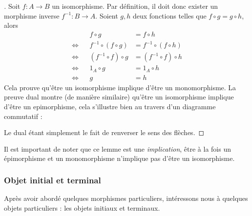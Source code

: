 \documentclass{article}
\begin{document}
\begin{proof}[]{}
    Soit $f:A\to B$ un isomorphisme. Par définition, il doit donc exister un morphisme inverse $f^{-1}:B\to A$. Soient $g, h$ deux fonctions telles que $f\circ g=g\circ h$, alors
    \begin{equation*}
    \begin{aligned}
                        && f\circ g&=f\circ h\\
        \Leftrightarrow && f^{-1}\circ(f\circ g)&=f^{-1}\circ(f\circ h)\\
        \Leftrightarrow && (f^{-1}\circ f)\circ g&=(f^{-1}\circ f)\circ h\\
        \Leftrightarrow && 1_A\circ g&=1_A\circ h\\
        \Leftrightarrow && g&=h
    \end{aligned}
    \end{equation*}
    Cela prouve qu'être un isomorphisme implique d'être un monomorphisme. La preuve dual montre (de manière similaire) qu'être un isomorphisme implique d'être un epimorphisme, cela s'illustre bien au travers d'un diagramme commutatif :

    \begin{center}
    \end{center}
    Le dual étant simplement le fait de renverser le sens des flèches.
\end{proof}

\noindent
Il est important de noter que ce lemme est une \textit{implication}, être à la fois un épimorphisme et un monomorphisme n'implique pas d'être un isomorphisme.

\subsubsection{Objet initial et terminal}
Après avoir abordé quelques morphismes particuliers, intéressons nous à quelques objets particuliers : les objets initiaux et terminaux.
\end{document}
